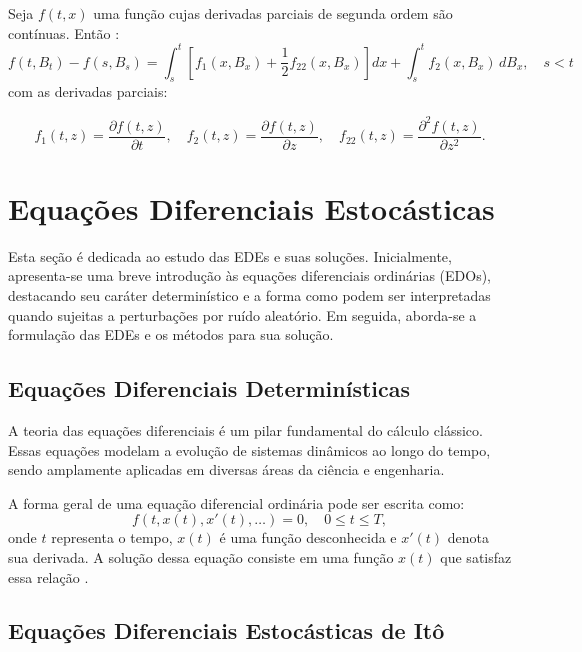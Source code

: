 \documentclass[12pt,openright,oneside,a4paper]{abntex2}
\numberwithin{equation}{section}
\begin{document}
Seja $f(t, x)$ uma função cujas derivadas parciais de segunda ordem são contínuas. Então \parencite [p.~117] {Mikosh}:
\begin{equation}
f(t, B_t) - f(s, B_s) 
= \int_s^t \left[ f_1(x, B_x) + \frac{1}{2} f_{22}(x, B_x) \right] dx 
+ \int_s^t f_2(x, B_x) \, dB_x,
\quad s < t
\end{equation}
com as derivadas parciais:

\[
f_1(t, z) = \frac{\partial f(t, z)}{\partial t}, \quad
f_2(t, z) = \frac{\partial f(t, z)}{\partial z}, \quad
f_{22}(t, z) = \frac{\partial^2 f(t, z)}{\partial z^2}.
\]


\section{Equações Diferenciais Estocásticas}


Esta seção é dedicada ao estudo das EDEs e suas soluções. Inicialmente, apresenta-se uma breve introdução às equações diferenciais ordinárias (EDOs), destacando seu caráter determinístico e a forma como podem ser interpretadas quando sujeitas a perturbações por ruído aleatório. Em seguida, aborda-se a formulação das EDEs e os métodos para sua solução.

\subsection{Equações Diferenciais Determinísticas}

A teoria das equações diferenciais é um pilar fundamental do cálculo clássico. Essas equações modelam a evolução de sistemas dinâmicos ao longo do tempo, sendo amplamente aplicadas em diversas áreas da ciência e engenharia.

A forma geral de uma equação diferencial ordinária pode ser escrita como:
$$
f(t, x(t), x'(t), \dots) = 0, \quad 0 \leq t \leq T,
$$
onde $t$ representa o tempo, $x(t)$ é uma função desconhecida e $x'(t)$ denota sua derivada. A solução dessa equação consiste em uma função $x(t)$ que satisfaz essa relação \parencite [p.~132] {Mikosh}.

\subsection{Equações Diferenciais Estocásticas de Itô}
\end{document}
